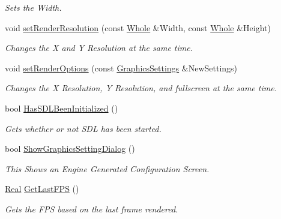 \begin{DoxyCompactItemize}
\begin{DoxyCompactList}\small\item\em Sets the Width. \item\end{DoxyCompactList}\item 
void \hyperlink{classphys_1_1GraphicsManager_ad61858461f05ddb9cadec77eea41abde}{setRenderResolution} (const \hyperlink{namespacephys_a460f6bc24c8dd347b05e0366ae34f34a}{Whole} \&Width, const \hyperlink{namespacephys_a460f6bc24c8dd347b05e0366ae34f34a}{Whole} \&Height)
\begin{DoxyCompactList}\small\item\em Changes the X and Y Resolution at the same time. \item\end{DoxyCompactList}\item 
void \hyperlink{classphys_1_1GraphicsManager_aeeca7f0fc3c3b31abc153031fa4ccbf2}{setRenderOptions} (const \hyperlink{structphys_1_1GraphicsSettings}{GraphicsSettings} \&NewSettings)
\begin{DoxyCompactList}\small\item\em Changes the X Resolution, Y Resolution, and fullscreen at the same time. \item\end{DoxyCompactList}\item 
bool \hyperlink{classphys_1_1GraphicsManager_ad07600281c765e22bc413a1a9df1a22c}{HasSDLBeenInitialized} ()
\begin{DoxyCompactList}\small\item\em Gets whether or not SDL has been started. \item\end{DoxyCompactList}\item 
bool \hyperlink{classphys_1_1GraphicsManager_adcded385b6442aa5da6097f1edd5471a}{ShowGraphicsSettingDialog} ()
\begin{DoxyCompactList}\small\item\em This Shows an Engine Generated Configuration Screen. \item\end{DoxyCompactList}\item 
\hyperlink{namespacephys_af7eb897198d265b8e868f45240230d5f}{Real} \hyperlink{classphys_1_1GraphicsManager_ac1b8450e3cb7d83d0414322fcf403421}{GetLastFPS} ()
\begin{DoxyCompactList}\small\item\em Gets the FPS based on the last frame rendered. \item\end{DoxyCompactList}\item 

\end{DoxyCompactItemize}
